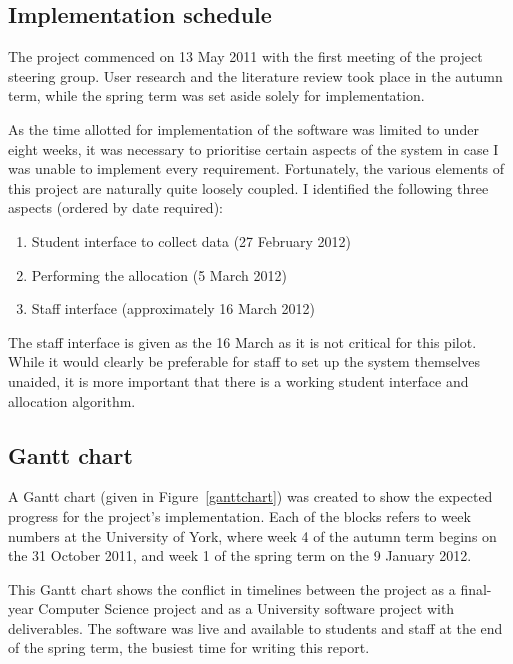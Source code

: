 
\subsection{Implementation schedule}

The project commenced on 13 May 2011 with the first meeting of the project
steering group. User research and the literature review took place in the
autumn term, while the spring term was set aside solely for implementation.

As the time allotted for implementation of the software was limited to under
eight weeks, it was necessary to prioritise certain aspects of the system in
case I was unable to implement every requirement. Fortunately, the various
elements of this project are naturally quite loosely coupled. I identified the
following three aspects (ordered by date required):

\begin{enumerate}
  \item Student interface to collect data (27 February 2012)
  \item Performing the allocation (5 March 2012)
  \item Staff interface (approximately 16 March 2012)
\end{enumerate}

The staff interface is given as the 16 March as it is not critical for this
pilot. While it would clearly be preferable for staff to set up the system
themselves unaided, it is more important that there is a working student
interface and allocation algorithm.

\subsection{Gantt chart}

A Gantt chart (given in Figure~\ref{ganttchart}) was created to show the
expected progress for the project's implementation. Each of the blocks refers
to week numbers at the University of York, where week 4 of the autumn term
begins on the 31 October 2011, and week 1 of the spring term on the 9 January
2012.

This Gantt chart shows the conflict in timelines between the project as a
final-year Computer Science project and as a University software project with
deliverables. The software was live and available to students and staff at the
end of the spring term, the busiest time for writing this report.


